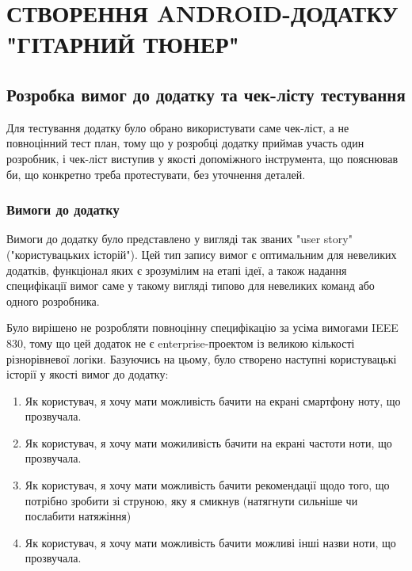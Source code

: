 \section{СТВОРЕННЯ ANDROID-ДОДАТКУ "ГІТАРНИЙ ТЮНЕР"}


\subsection{Розробка вимог до додатку та чек-лісту тестування}

Для тестування додатку було обрано використувати саме чек-ліст, а не повноцінний тест план, тому що у розробці додатку приймав участь один розробник, і чек-ліст виступив у якості допоміжного інструмента, що пояснював би, що конкретно треба протестувати, без уточнення деталей.

\subsubsection{Вимоги до додатку}

Вимоги до додатку було представлено у вигляді так званих "user story" ("користувацьких історій"). Цей тип запису вимог є оптимальним для невеликих додатків, функціонал яких є зрозумілим на етапі ідеї, а також надання специфікації вимог саме у такому вигляді типово для невеликих команд або одного розробника. 

Було вирішено не розробляти повноцінну специфікацію за усіма вимогами IEEE 830, тому що цей додаток не є enterprise-проектом із великою кількості різнорівневої логіки. Базуючись на цьому, було створено наступні користувацькі історії у якості вимог до додатку:

\begin{enumerate}
    \item Як користувач, я хочу мати можливість бачити на екрані смартфону ноту, що прозвучала.
    \item Як користувач, я хочу мати можиливість бачити на екрані частоти ноти, що прозвучала.
    \item Як користувач, я хочу мати можливість бачити рекомендації щодо того, що потрібно зробити зі струною, яку я смикнув (натягнути сильніше чи послабити натяжіння)
    \item Як користувач, я хочу мати можливість бачити можливі інші назви ноти, що прозвучала.
    
\end{enumerate}

